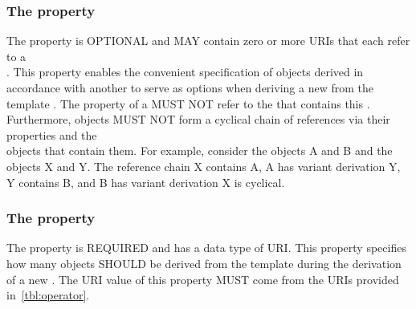\subsubsection*{ The  property}\label{sec:variantDerivations}

The  property is OPTIONAL and MAY contain zero or more URIs that each refer to a\\ . This property enables the convenient specification of  objects derived in accordance with another  to serve as options when deriving a new  from the template . The  property of a  MUST NOT refer to the  that contains this . Furthermore,  objects MUST NOT form a cyclical chain of references via their  properties and the\\  objects that contain them. For example, consider the  objects A and B and the  objects X and Y. The reference chain X contains A, A has variant derivation Y, Y contains B, and B has variant derivation X is cyclical.

\subsubsection*{ The  property}\label{sec:operator}

The  property is REQUIRED and has a data type of URI. This property specifies how many  objects SHOULD be derived from the template  during the derivation of a new . The URI value of this property MUST come from the URIs provided in~\ref{tbl:operator}.


